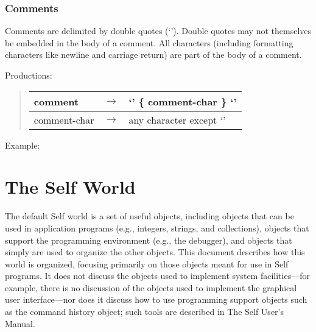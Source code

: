 \documentclass[letterpaper,10pt,english]{sphinxmanual}
\begin{document}
\subsection{Comments}
\label{\detokenize{langref:comments}}
Comments are delimited by double quotes (‘\sphinxquotedblright{}’). Double quotes may not themselves be embedded
in the body of a comment. All characters (including formatting characters like newline and carriage
return) are part of the body of a comment.

Productions:
\begin{quote}

\noindent\begin{tabulary}{\linewidth}{|L|L|L|}
\hline

comment
&
\(\rightarrow\)
&
‘\sphinxquotedblright{}’ \{ comment-char \} ‘\sphinxquotedblright{}’
\\
\hline
comment-char
&
\(\rightarrow\)
&
any character except ‘\sphinxquotedblright{}’
\\
\hline\end{tabulary}

\end{quote}

Example:
\begin{quote}

\end{quote}


\chapter{The Self World}
\label{\detokenize{selfwrld::doc}}\label{\detokenize{selfwrld:the-self-world}}
The default Self world is a set of useful objects, including objects that can be used in application
programs (e.g., integers, strings, and collections), objects that support the programming environment
(e.g., the debugger), and objects that simply are used to organize the other objects. This document
describes how this world is organized, focusing primarily on those objects meant for use in
Self programs. It does not discuss the objects used to implement system facilities—for example,
there is no discussion of the objects used to implement the graphical user interface—nor does it
discuss how to use programming support objects such as the command history object; such tools
are described in The Self User’s Manual.
\end{document}
